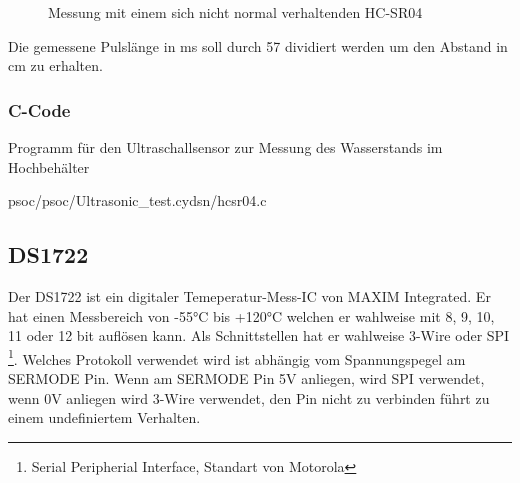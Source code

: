 \documentclass[12pt,a4paper]{article}
\begin{document}
	\begin{figure}[H]
		
		\centering
		\label{fig:hc-sr04_broken}

		\caption{Messung mit einem sich nicht normal verhaltenden 
			HC-SR04}
	\end{figure}

	Die gemessene Pulslänge in ms soll durch 57 dividiert werden um den
	Abstand in cm zu erhalten.

	\subsubsection{C-Code}
	
	Programm für den Ultraschallsensor zur Messung des Wasserstands im 
	Hochbehälter

	
	{psoc/psoc/Ultrasonic_test.cydsn/hcsr04.c}

	
	
\subsection{DS1722}

	Der DS1722 ist ein digitaler Temeperatur-Mess-IC von MAXIM Integrated.
	Er hat einen Messbereich von -55°C bis +120°C welchen er wahlweise mit
	8, 9, 10, 11 oder 12 bit auflösen kann. Als Schnittstellen hat er
	wahlweise 3-Wire oder SPI
	\footnote{Serial Peripherial Interface, Standart von Motorola}. Welches
	Protokoll verwendet wird ist abhängig vom Spannungspegel am SERMODE
	Pin. Wenn am SERMODE Pin 5V anliegen, wird SPI verwendet, wenn 0V
	anliegen wird 3-Wire verwendet, den Pin nicht zu verbinden führt zu einem
	undefiniertem Verhalten.
\end{document}
